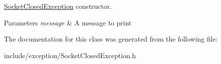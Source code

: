 \hyperlink{class_f_t_p_1_1_socket_closed_exception}{Socket\-Closed\-Exception} constructor. 


\begin{DoxyParams}{Parameters}
{\em message} & A message to print \\
\hline
\end{DoxyParams}


The documentation for this class was generated from the following file\-:\begin{DoxyCompactItemize}
\item 
include/exception/Socket\-Closed\-Exception.\-h\end{DoxyCompactItemize}
